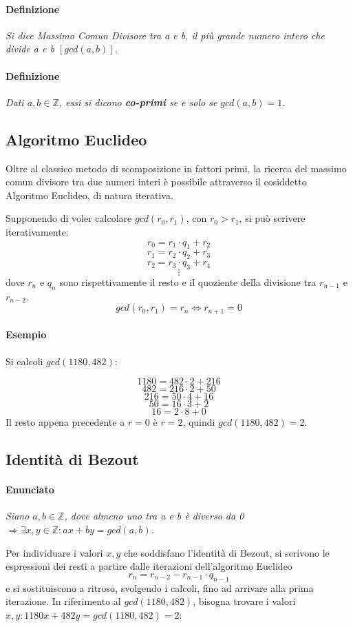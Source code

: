 \documentclass[a4paper]{report}
\begin{document}
\paragraph{Definizione} \textit{Si dice Massimo Comun Divisore tra a e b, il più grande numero intero che divide a e b $[gcd(a,b)]$.}
\paragraph{Definizione} \textit{Dati $a,b\in \mathbb{Z}$, essi si dicono \textbf{co-primi} se e solo se $gcd(a,b)=1$.}
\subsection{Algoritmo Euclideo} Oltre al classico metodo di scomposizione in fattori primi, la ricerca del massimo comun divisore tra due numeri interi è possibile attraverso il cosiddetto Algoritmo Euclideo, di natura iterativa.

Supponendo di voler calcolare $gcd(r_0,r_1)$, con $r_0>r_1$, si può scrivere iterativamente:
$$r_0=r_1\cdot q_1 + r_2$$
$$r_1=r_2\cdot q_2 + r_3$$
$$r_2=r_3\cdot q_3 + r_4$$
$$\vdots$$
dove $r_n$ e $q_n$ sono rispettivamente il resto e il quoziente della divisione tra $r_{n-1}$ e $r_{n-2}$.
$$gcd(r_0,r_1)=r_n \Leftrightarrow r_{n+1}=0$$
\paragraph{Esempio}
Si calcoli $gcd(1180,482)$:

$$1180=482\cdot 2 + 216$$
$$482=216\cdot 2 + 50$$
$$216=50\cdot 4 + 16$$
$$50=16\cdot 3 + 2$$
$$16 = 2\cdot 8 + 0$$
Il resto appena precedente a $r=0$ è $r=2$, quindi $gcd(1180,482)=2$.
\subsection{Identità di Bezout}
\paragraph{Enunciato} \textit{Siano $a,b \in \mathbb{Z}$, dove almeno uno tra a e b è diverso da 0 $\Rightarrow \exists x,y \in \mathbb{Z}: ax+by=gcd(a,b)$.}

Per individuare i valori $x,y$ che soddisfano l'identità di Bezout, si scrivono le espressioni dei resti a partire dalle iterazioni dell'algoritmo Euclideo
$$r_n=r_{n-2}-r_{n-1}\cdot q_{n-1}$$
e si sostituiscono a ritroso, svolgendo i calcoli, fino ad arrivare alla prima iterazione. In riferimento al $gcd(1180,482)$, bisogna trovare i valori $x,y: 1180x+482y=gcd(1180,482)=2$:
\end{document}
